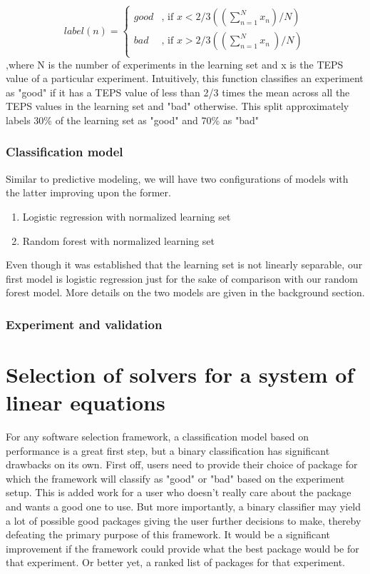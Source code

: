 \[
  label(n) =
  \begin{cases}
                                   good & \text{, if $x < 2/3((\sum_{n=1}^{N} x_{n} )/N)$} \\
                                   bad & \text{, if $x > 2/3((\sum_{n=1}^{N} x_{n} \ )/N)$} \\
  \end{cases}
\]
 ,where N is the number of experiments in the learning set and x is the TEPS value of a particular experiment. Intuitively, this function classifies an experiment as "good" if it has a TEPS value of less than 2/3 times the mean across all the TEPS values in the learning set and "bad" otherwise. This split approximately labels 30\% of the learning set as "good" and 70\% as "bad"
   
\subsubsection{Classification model}
Similar to predictive modeling, we will have two configurations of models with the latter improving upon the former. 


\begin{enumerate}
    \item Logistic regression with normalized learning set
    \item Random forest with normalized learning set
\end{enumerate}
Even though it was established that the learning set is not linearly separable, our first model is logistic regression just for the sake of comparison with our random forest model. More details on the two models are given in the background section.\\

\subsubsection{Experiment and validation}


\section{Selection of solvers for a system of linear equations}
For any software selection framework, a classification model based on performance is a great first step, but a binary classification has significant drawbacks on its own. First off, users need to provide their choice of package for which the framework will classify as "good" or "bad" based on the experiment setup. This is added work for a user who doesn't really care about the package and wants a good one to use. But more importantly, a binary classifier may yield a lot of possible good packages giving the user further decisions to make, thereby defeating the primary purpose of this framework. It would be a significant improvement if the framework could provide what the best package would be for that experiment. Or better yet, a ranked list of packages for that experiment.

